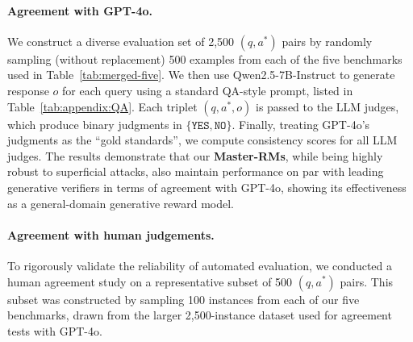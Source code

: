 \paragraph{Agreement with GPT-4o. } We construct a diverse evaluation set of 2,500 $(q, a^*)$ pairs by randomly sampling (without replacement) 500 examples from each of the five benchmarks used in Table~\ref{tab:merged-five}. We then use Qwen2.5-7B-Instruct to generate response $o$ for each query using a standard QA-style prompt, listed in Table~\ref{tab:appendix:QA}. Each triplet $(q, a^*, o)$ is passed to the LLM judges, which produce binary judgments in $\{\texttt{YES}, \texttt{NO}\}$.
Finally, treating GPT-4o's judgments as the ``gold standards'', we compute consistency scores for all LLM judges. The results demonstrate that our \textbf{Master-RMs}, while being highly robust to superficial attacks, also maintain performance on par with leading generative verifiers in terms of agreement with GPT-4o, showing its effectiveness as a general-domain generative reward model.

\paragraph{Agreement with human judgements.} 

To rigorously validate the reliability of automated evaluation, we conducted a human agreement study on a representative subset of 500 $(q, a^*)$ pairs. This subset was constructed by sampling 100 instances from each of our five benchmarks, drawn from the larger 2,500-instance dataset used for agreement tests with GPT-4o. 

